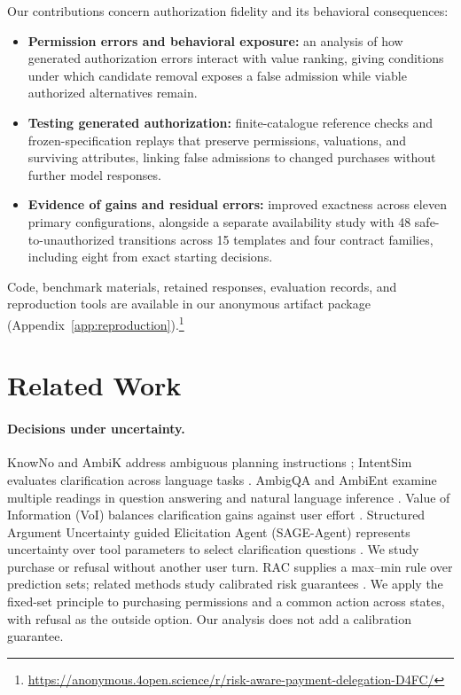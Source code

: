 \documentclass[11pt]{article}
\begin{document}
Our contributions concern authorization fidelity and its behavioral consequences:
\begin{itemize}
\item \textbf{Permission errors and behavioral exposure:} an analysis of how generated authorization errors interact with value ranking, giving conditions under which candidate removal exposes a false admission while viable authorized alternatives remain.
\item \textbf{Testing generated authorization:} finite-catalogue reference checks and frozen-specification replays that preserve permissions, valuations, and surviving attributes, linking false admissions to changed purchases without further model responses.
\item \textbf{Evidence of gains and residual errors:} improved exactness across eleven primary configurations, alongside a separate availability study with 48 safe-to-unauthorized transitions across 15 templates and four contract families, including eight from exact starting decisions.
\end{itemize}

Code, benchmark materials, retained responses, evaluation records, and reproduction tools are available in our anonymous artifact package (Appendix~\ref{app:reproduction}).\footnote{\url{https://anonymous.4open.science/r/risk-aware-payment-delegation-D4FC/}}
\section{Related Work}
\label{sec:related}
\paragraph{Decisions under uncertainty.}
KnowNo and AmbiK address ambiguous planning instructions \citep{knowno,ambik}; IntentSim evaluates clarification across language tasks \citep{intentsim}. AmbigQA and AmbiEnt examine multiple readings in question answering and natural language inference \citep{min2020ambigqa,liu2023ambiguity}. Value of Information (VoI) balances clarification gains against user effort \citep{voi}. Structured Argument Uncertainty guided Elicitation Agent (SAGE-Agent) represents uncertainty over tool parameters to select clarification questions \citep{sage}. We study purchase or refusal without another user turn. RAC supplies a max--min rule over prediction sets; related methods study calibrated risk guarantees \citep{rac,crc,actionrac}. We apply the fixed-set principle to purchasing permissions and a common action across states, with refusal as the outside option. Our analysis does not add a calibration guarantee.
\end{document}
